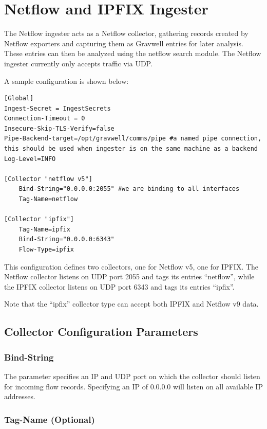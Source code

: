 \clearpage
\section{Netflow and IPFIX Ingester}
The Netflow ingester acts as a Netflow collector, gathering records
created by Netflow exporters and capturing them as Gravwell entries for
later analysis. These entries can then be analyzed using the netflow
search module. The Netflow ingester currently only accepts traffic via
UDP.

A sample configuration is shown below:

\begin{Verbatim}[breaklines=true]
[Global]
Ingest-Secret = IngestSecrets
Connection-Timeout = 0
Insecure-Skip-TLS-Verify=false
Pipe-Backend-target=/opt/gravwell/comms/pipe #a named pipe connection, this should be used when ingester is on the same machine as a backend
Log-Level=INFO

[Collector "netflow v5"]
    Bind-String="0.0.0.0:2055" #we are binding to all interfaces
    Tag-Name=netflow

[Collector "ipfix"]
    Tag-Name=ipfix
    Bind-String="0.0.0.0:6343"
    Flow-Type=ipfix
\end{Verbatim}

This configuration defines two collectors, one for Netflow v5, one for
IPFIX. The Netflow collector listens on UDP port 2055 and tags its
entries ``netflow'', while the IPFIX collector listens on UDP port 6343
and tags its entries ``ipfix''.

Note that the ``ipfix'' collector type can accept both IPFIX and Netflow v9 data.

\subsection{Collector Configuration Parameters}

\subsubsection{Bind-String}

The  parameter specifies an IP and UDP port on which
the collector should listen for incoming flow records. Specifying an IP
of 0.0.0.0 will listen on all available IP addresses.

\subsubsection{Tag-Name (Optional)}

